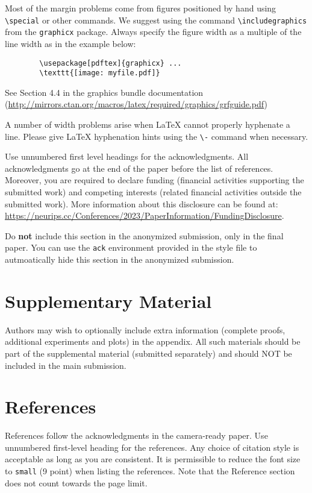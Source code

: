\documentclass{article}
\begin{document}
	
	Most of the margin problems come from figures positioned by hand using
	\verb+\special+ or other commands. We suggest using the command
	\verb+\includegraphics+ from the \verb+graphicx+ package. Always specify the
	figure width as a multiple of the line width as in the example below:
	\begin{verbatim}
		\usepackage[pdftex]{graphicx} ...
		\texttt{[image: myfile.pdf]}
	\end{verbatim}
	See Section 4.4 in the graphics bundle documentation
	(\url{http://mirrors.ctan.org/macros/latex/required/graphics/grfguide.pdf})
	
	
	A number of width problems arise when \LaTeX{} cannot properly hyphenate a
	line. Please give LaTeX hyphenation hints using the \verb+\-+ command when
	necessary.
	
	
	\begin{ack}
		Use unnumbered first level headings for the acknowledgments. All acknowledgments
		go at the end of the paper before the list of references. Moreover, you are required to declare
		funding (financial activities supporting the submitted work) and competing interests (related financial activities outside the submitted work).
		More information about this disclosure can be found at: \url{https://neurips.cc/Conferences/2023/PaperInformation/FundingDisclosure}.
		
		
		Do {\bf not} include this section in the anonymized submission, only in the final paper. You can use the \texttt{ack} environment provided in the style file to autmoatically hide this section in the anonymized submission.
	\end{ack}
	
	
	
	\section{Supplementary Material}
	
	Authors may wish to optionally include extra information (complete proofs, additional experiments and plots) in the appendix. All such materials should be part of the supplemental material (submitted separately) and should NOT be included in the main submission.
	
	
	\section*{References}
	
	
	References follow the acknowledgments in the camera-ready paper. Use unnumbered first-level heading for
	the references. Any choice of citation style is acceptable as long as you are
	consistent. It is permissible to reduce the font size to \verb+small+ (9 point)
	when listing the references.
	Note that the Reference section does not count towards the page limit.
	\medskip
	
\end{document}
